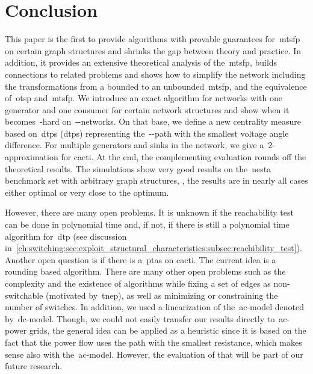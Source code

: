 \section{Conclusion}    
\label{ch:switching:sec:conclusion}
% 
This paper is the first to provide algorithms with provable guarantees
for~\gls{mtsfp} on certain graph structures and shrinks the gap between theory
and practice. In addition, it provides an extensive theoretical analysis of
the~\gls{mtsfp}, builds connections to related problems and shows how to
simplify the network including the transformations from a bounded to an 
unbounded~\gls{mtsfp}, and the equivalence of~\gls{otsp} and~\gls{mtsfp}. We
introduce an exact algorithm for networks with one generator and one consumer
for certain network structures and show when it becomes~\NP-hard
on~\source-\sink-networks. On that base, we define a new centrality measure
based on~\acrlong{dtp}{s} (\gls{dtp}{s}) representing
% 
the~\source-\sink-path with the smallest voltage angle difference. For multiple
generators and sinks in the network, we give a~$2$-approximation for cacti. At
the end, the complementing evaluation rounds off the theoretical results. The
simulations show very good results on the~\gls{nesta} benchmark set with
arbitrary graph structures, \ie, the results are in nearly all cases either
optimal or very close to the optimum.

However, there are many open problems. It is unknown if the reachability test
can be done in polynomial time and, if not, if there is still a polynomial time
algorithm for~\gls{dtp} (see discussion
in~\cref{ch:switching:sec:exploit_structural_characteristics:subsec:reachibility_test}).
Another open question is if there is a~\gls{ptas} on cacti. The current
idea is a rounding based algorithm. There are many other open problems such as
the complexity and the existence of algorithms while fixing a set of edges as
% 
non-switchable (motivated by~\gls{tnep}), as well as minimizing or
constraining the number of switches. In addition, we used a linearization of
the~\gls{ac}-model denoted by~\gls{dc}-model. Though, we could not
easily transfer our results directly to~\gls{ac}-power grids, the general
idea can be applied as a heuristic since it is based on the fact that the power
flow uses the path with the smallest resistance, which makes sense also with
the~\gls{ac}-model. However, the evaluation of that will be part of our
future research.
% 